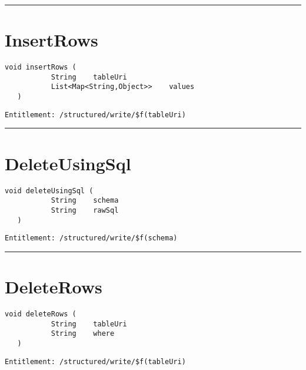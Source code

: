 \rule{12cm}{2pt}
\section{InsertRows}
\label{Api:InsertRows}
\begin{lstlisting}[style=nonumbers]
   void insertRows (
           String    tableUri
           List<Map<String,Object>>    values
   )
\end{lstlisting}
\begin{Verbatim}[formatcom=\color{Maroon}]
  Entitlement: /structured/write/$f(tableUri)
\end{Verbatim}



\rule{12cm}{2pt}
\section{DeleteUsingSql}
\label{Api:DeleteUsingSql}
\begin{lstlisting}[style=nonumbers]
   void deleteUsingSql (
           String    schema
           String    rawSql
   )
\end{lstlisting}
\begin{Verbatim}[formatcom=\color{Maroon}]
  Entitlement: /structured/write/$f(schema)
\end{Verbatim}



\rule{12cm}{2pt}
\section{DeleteRows}
\label{Api:DeleteRows}
\begin{lstlisting}[style=nonumbers]
   void deleteRows (
           String    tableUri
           String    where
   )
\end{lstlisting}
\begin{Verbatim}[formatcom=\color{Maroon}]
  Entitlement: /structured/write/$f(tableUri)
\end{Verbatim}



